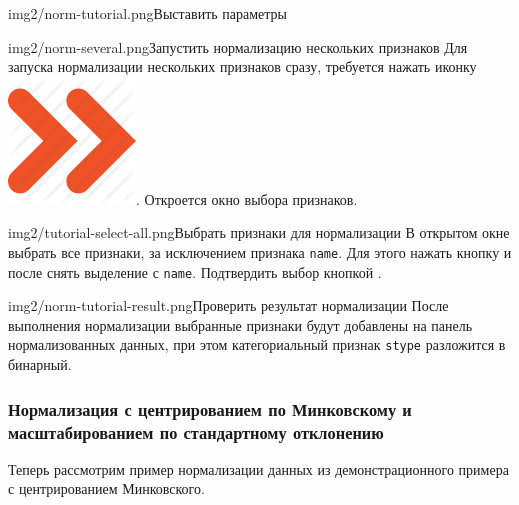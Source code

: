 \documentclass[12pt,tikz]{instruction}
\begin{document}
\begin{steps}
\begin{ist}{img2/norm-tutorial.png}{Выставить параметры}
	\end{ist}	
	\begin{ist}{img2/norm-several.png}{Запустить нормализацию нескольких признаков }
		Для запуска нормализации нескольких признаков сразу, требуется нажать иконку \includegraphics[scale=0.1]{img2/norm_all.png}. Откроется окно выбора признаков.
	\end{ist}
	\begin{ist}{img2/tutorial-select-all.png}{Выбрать признаки для нормализации}
		В открытом окне выбрать все признаки, за исключением признака \texttt{name}. Для этого нажать кнопку  и после снять выделение с \texttt{name}. Подтвердить выбор кнопкой . \vspace{1cm}
	\end{ist}
	\begin{ist}{img2/norm-tutorial-result.png}{Проверить результат нормализации}
		После выполнения нормализации выбранные признаки будут добавлены на панель нормализованных данных, при этом категориальный признак \texttt{stype} разложится в бинарный.
	\end{ist}
\end{steps}

\subsubsection{Нормализация с центрированием по Минковскому и масштабированием по стандартному отклонению}
\label{subsubseq:example_norm2}
Теперь рассмотрим пример нормализации данных из демонстрационного примера с центрированием Минковского.
\end{document}
